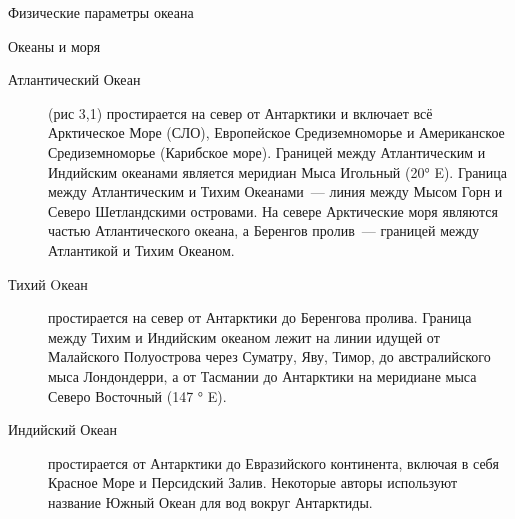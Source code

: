 \begin{chapter}{Физические параметры океана}
\begin{section}{Океаны и моря}
\begin{description}
\item[Атлантический Океан] (рис 3,1) простирается на север от
Антарктики и включает всё Арктическое Море (СЛО), Европейское
Средиземноморье и Американское Средиземноморье (Карибское
море). Границей между Атлантическим и Индийским океанами является
меридиан Мыса Игольный (20° E). Граница между Атлантическим и Тихим
Океанами~--- линия между Мысом Горн и Северо Шетландскими
островами. На севере Арктические моря являются частью Атлантического
океана, а Беренгов пролив~--- границей между Атлантикой и Тихим
Океаном.
%



\item[Тихий Oкеан] простирается на север от Антарктики до Беренгова
пролива. Граница между Тихим и Индийским океаном лежит на линии идущей
от Малайского Полуострова через Суматру, Яву, Тимор, до австралийского
мыса Лондондерри, а от Тасмании до Антарктики на меридиане мыса Северо
Восточный (147 ° E).
%



\item[Индийский Океан] простирается от Антарктики до Евразийского
континента, включая в себя Красное Море и Персидский Залив. Некоторые
авторы используют название Южный Океан для вод вокруг Антарктиды.
%




\end{description}
\end{section}
\end{chapter}
